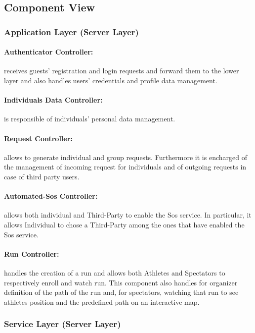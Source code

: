 \documentclass[a4paper]{article}
\begin{document}
\subsection{Component View}
    \subsubsection{Application Layer (Server Layer)}
    \paragraph{Authenticator Controller:}
    receives guests' registration and login requests and forward them to the lower layer and also handles users' credentials and profile data management.
    
    \paragraph{Individuals Data Controller:}
    is responsible of individuals' personal data management.
    
    \paragraph{Request Controller:}
    allows to generate individual and group requests. Furthermore it is encharged of the management of incoming request for individuals and of outgoing requests in case of third party users.
    
    \paragraph{Automated-Sos Controller:}
    allows both individual and Third-Party to enable the Sos service. In particular, it allows Individual to chose a Third-Party among the ones that have enabled the Sos service.

    \paragraph{Run Controller:}
    handles the creation of a run and allows both Athletes and Spectators to respectively enroll and watch run. This component also handles for organizer definition of the path of the run and, for spectators, watching that run to see athletes position and the predefined path on an interactive map.
    
    \subsubsection{Service Layer (Server Layer)}
\end{document}
